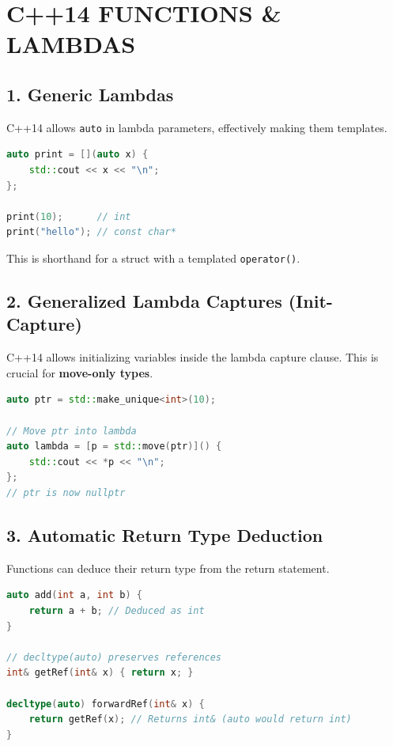 \hypertarget{c14-functions-lambdas}{%
\chapter{C++14 FUNCTIONS \& LAMBDAS}\label{c14-functions-lambdas}}

\hypertarget{generic-lambdas}{%
\section{1. Generic Lambdas}\label{generic-lambdas}}

C++14 allows \passthrough{\lstinline!auto!} in lambda parameters,
effectively making them templates.

\begin{lstlisting}[language={C++}]
auto print = [](auto x) {
    std::cout << x << "\n";
};

print(10);      // int
print("hello"); // const char*
\end{lstlisting}

This is shorthand for a struct with a templated
\passthrough{\lstinline!operator()!}.

\hypertarget{generalized-lambda-captures-init-capture}{%
\section{2. Generalized Lambda Captures
(Init-Capture)}\label{generalized-lambda-captures-init-capture}}

C++14 allows initializing variables inside the lambda capture clause.
This is crucial for \textbf{move-only types}.

\begin{lstlisting}[language={C++}]
auto ptr = std::make_unique<int>(10);

// Move ptr into lambda
auto lambda = [p = std::move(ptr)]() {
    std::cout << *p << "\n";
};
// ptr is now nullptr
\end{lstlisting}

\hypertarget{automatic-return-type-deduction}{%
\section{3. Automatic Return Type
Deduction}\label{automatic-return-type-deduction}}

Functions can deduce their return type from the return statement.

\begin{lstlisting}[language={C++}]
auto add(int a, int b) {
    return a + b; // Deduced as int
}

// decltype(auto) preserves references
int& getRef(int& x) { return x; }

decltype(auto) forwardRef(int& x) {
    return getRef(x); // Returns int& (auto would return int)
}
\end{lstlisting}
